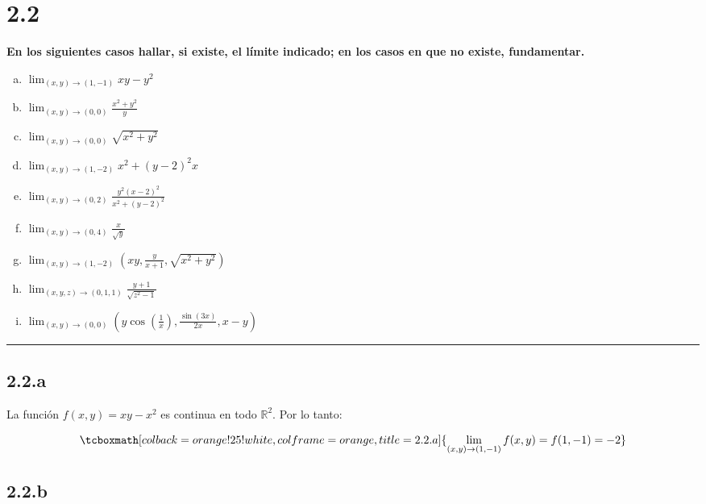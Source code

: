 \documentclass{article}
\renewcommand{\Bbb}{\mathbb}
\begin{document}
\section*{2.2}
\label{sec:2.2}

\textbf{En los siguientes casos hallar, si existe, el límite indicado; en los casos en que no existe, fundamentar.} 

\begin{enumerate}[(a)]
\bfseries
\item $ \lim_{(x,y) \rightarrow (1,-1)} xy - y^2 $
\item $ \lim_{(x,y) \rightarrow (0,0)} \frac{x^2 + y^2}{y} $
\item $ \lim_{(x,y) \rightarrow (0,0)} \sqrt{x^2 + y^2} $
\item $ \lim_{(x,y) \rightarrow (1,-2)} x^2 + (y-2)^2 x $
\item $ \lim_{(x,y) \rightarrow (0,2)} \frac{y^2 (x-2)^2}{x^2 + (y-2)^2} $
\item $ \lim_{(x,y) \rightarrow (0,4)} \frac{x}{\sqrt{y}} $
\item $ \lim_{(x,y) \rightarrow (1,-2)} \left( xy, \frac{y}{x+1}, \sqrt{x^2 + y^2} \right) $
\item $ \lim_{(x,y,z) \rightarrow (0,1,1)} \frac{y+1}{\sqrt{z^2 - 1}} $
\item $ \lim_{(x,y) \rightarrow (0,0)} \left( y \cos\left(\frac{1}{x}\right), \frac{\sin(3x)}{2x}, x-y \right) $
\end{enumerate}
\hrule

\subsection*{2.2.a}
\label{subsec:2.2.a}

La función $f(x,y) = xy - x^2$ es continua en todo $\Bbb R^2$. Por lo tanto:

\begin{equation}
\tcboxmath[colback=orange!25!white,colframe=orange,title=2.2.a]
{ \lim_{(x,y) \rightarrow (1,-1)} f(x,y) = f(1,-1) = -2 }
\end{equation}

\subsection*{2.2.b}
\label{subsec:2.2.b}
\end{document}
